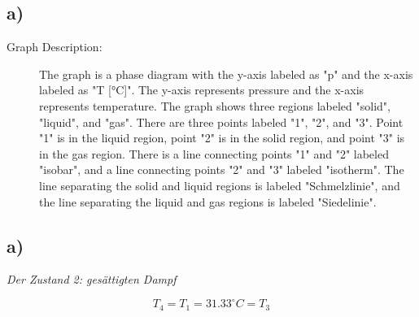 

\subsection*{a)}

\begin{description}
    \item[Graph Description:] The graph is a phase diagram with the y-axis labeled as "p" and the x-axis labeled as "T [°C]". The y-axis represents pressure and the x-axis represents temperature. The graph shows three regions labeled "solid", "liquid", and "gas". There are three points labeled "1", "2", and "3". Point "1" is in the liquid region, point "2" is in the solid region, and point "3" is in the gas region. There is a line connecting points "1" and "2" labeled "isobar", and a line connecting points "2" and "3" labeled "isotherm". The line separating the solid and liquid regions is labeled "Schmelzlinie", and the line separating the liquid and gas regions is labeled "Siedelinie".
\end{description}



\subsection*{a)}
\textit{Der Zustand 2: gesättigten Dampf}

\[ T_4 = T_1 = 31.33^\circ C = T_3 \]